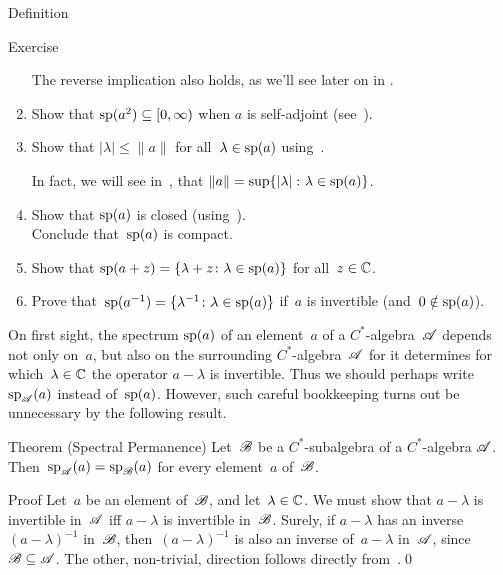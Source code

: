 \documentclass[main]{subfiles}
\begin{document}
\begin{parsec}
\begin{point}{Definition}
\begin{point}{Exercise}
\begin{enumerate}
The reverse implication also holds,
as we'll see later on in \TODO{}.
\item
Show that $\mathrm{sp}(a^2)\subseteq [0,\infty)$ when $a$ is self-adjoint
(see~).

\item
Show that $|\lambda|\leq \|a\|$ for all~$\lambda\in\mathrm{sp}(a)$
using~.

In fact, we will see in~,
that $\|a\|=\sup\{\left|\lambda\right|\colon \lambda\in \mathrm{sp}(a)\}$.
\item
Show that $\mathrm{sp}(a)$ is closed (using~).\\
Conclude that~$\mathrm{sp}(a)$ is compact.
\item
Show that $\mathrm{sp}(a+z)=\{\lambda+z\colon \lambda\in\mathrm{sp}(a)\}$
for all~$z\in \mathbb{C}$.
\item
Prove that~$\mathrm{sp}(a^{-1})=\{\lambda^{-1}\colon \lambda\in \mathrm{sp}(a)\}$
if~$a$ is invertible (and~$0\notin \mathrm{sp}(a)$).
\end{enumerate}
\end{point}
\end{point}
\begin{point}%
On first sight,
the spectrum $\mathrm{sp}(a)$
of an element~$a$ of a $C^*$-algebra~$\mathscr{A}$ 
depends not only on~$a$,
but also on the surrounding $C^*$-algebra~$\mathscr{A}$ for it determines
for which~$\lambda\in\mathbb{C}$ the operator $a-\lambda$ is invertible.
Thus we should perhaps write $\mathrm{sp}_{\mathscr{A}}(a)$ instead
of~$\mathrm{sp}(a)$.
However, such careful bookkeeping turns out 
be unnecessary
by the following result.
\end{point}
\begin{point}{Theorem (Spectral Permanence)}%
Let~$\mathscr{B}$ be a $C^*$-subalgebra of a $C^*$-algebra $\mathscr{A}$.
Then~$\mathrm{sp}_{\mathscr{A}}(a)=\mathrm{sp}_{\mathscr{B}}(a)$
for every element~$a$ of~$\mathscr{B}$.
\begin{point}{Proof}%
Let~$a$ be an element of~$\mathscr{B}$,
and let~$\lambda\in \mathbb{C}$.
We must show that $a-\lambda$ is invertible in~$\mathscr{A}$
iff $a-\lambda$ is invertible in~$\mathscr{B}$.
Surely,
if $a-\lambda$ has an inverse $(a-\lambda)^{-1}$ in~$\mathscr{B}$,
then~$(a-\lambda)^{-1}$ is also an inverse of~$a-\lambda$ in~$\mathscr{A}$,
since~$\mathscr{B}\subseteq \mathscr{A}$.
The other, non-trivial, direction follows
directly from~.\qed%
\end{point}
\end{point}
\end{parsec}
\end{document}
